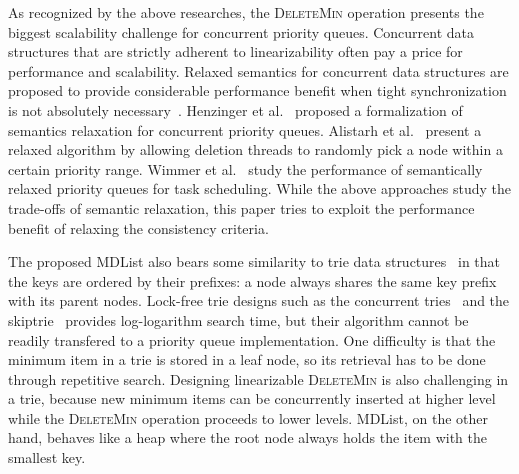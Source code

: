 \documentclass[10pt,journal,letter,compsoc]{IEEEtran}
\begin{document}
As recognized by the above researches, the \textsc{DeleteMin} operation presents the biggest scalability challenge for concurrent priority queues.
Concurrent data structures that are strictly adherent to linearizability often pay a price for performance and scalability.
Relaxed semantics for concurrent data structures are proposed to provide considerable performance benefit when tight synchronization is not absolutely necessary~\cite{afek2010quasi,henzinger2013quantitative}.
Henzinger et al.~\cite{henzinger2013quantitative} proposed a formalization of semantics relaxation for concurrent priority queues.
Alistarh et al.~\cite{alistarh2014spraylist} present a relaxed algorithm by allowing deletion threads to randomly pick a node within a certain priority range.
Wimmer et al.~\cite{wimmer2013data} study the performance of semantically relaxed priority queues for task scheduling.
While the above approaches study the trade-offs of semantic relaxation, this paper tries to exploit the performance benefit of relaxing the consistency criteria.

The proposed MDList also bears some similarity to trie data structures~\cite{fredkin1960trie,willard1983log} in that the keys are ordered by their prefixes: a node always shares the same key prefix with its parent nodes.
Lock-free trie designs such as the concurrent tries~\cite{prokopec2012concurrent} and the skiptrie~\cite{oshman2013skiptrie} provides log-logarithm search time, but their algorithm cannot be readily transfered to a priority queue implementation.
One difficulty is that the minimum item in a trie is stored in a leaf node, so its retrieval has to be done through repetitive search.
Designing linearizable \textsc{DeleteMin} is also challenging in a trie, because new minimum items can be concurrently inserted at higher level while the \textsc{DeleteMin} operation proceeds to lower levels.
MDList, on the other hand, behaves like a heap where the root node always holds the item with the smallest key.
\end{document}
